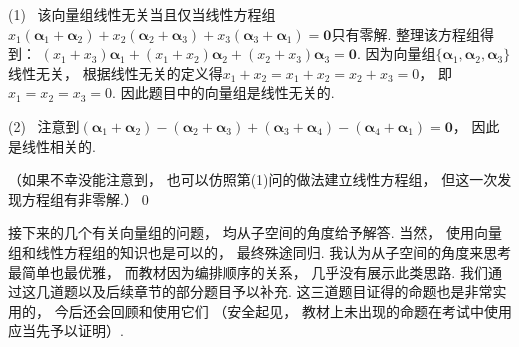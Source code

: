 \begin{solution}
    (1)~
    该向量组线性无关当且仅当线性方程组
    $x_1(\bm{\alpha}_1+\bm{\alpha}_2)+
     x_2(\bm{\alpha}_2+\bm{\alpha}_3)+
     x_3(\bm{\alpha}_3+\bm{\alpha}_1) = \bm{0}$只有零解.
     整理该方程组得到：
     $(x_1 + x_3)\bm{\alpha}_1
     + (x_1 + x_2)\bm{\alpha}_2
     + (x_2 + x_3)\bm{\alpha}_3 = \bm{0}$.
     因为向量组$\{ \bm{\alpha}_1 , \bm{\alpha}_2 , \bm{\alpha}_3 \}$线性无关，
     根据线性无关的定义得$x_1 + x_2 = x_1 + x_2 = x_2 + x_3 = 0$，
     即$x_1 = x_2 = x_3 = 0$.
     因此题目中的向量组是线性无关的.

     (2)~
     注意到$(\bm{\alpha}_1+\bm{\alpha}_2)
     -(\bm{\alpha}_2+\bm{\alpha}_3)
    +(\bm{\alpha}_3+\bm{\alpha}_4)
    -(\bm{\alpha}_4+\bm{\alpha}_1) = \bm{0}$，
    因此是线性相关的.
    
    （如果不幸没能注意到，
    也可以仿照第(1)问的做法建立线性方程组，
    但这一次发现方程组有非零解.）\qed
\end{solution}

\bigskip

接下来的几个有关向量组的问题，
均从子空间的角度给予解答.
当然，
使用向量组和线性方程组的知识也是可以的，
最终殊途同归.
我认为从子空间的角度来思考最简单也最优雅，
而教材因为编排顺序的关系，
几乎没有展示此类思路.
我们通过这几道题以及后续章节的部分题目予以补充.
这三道题目证得的命题也是非常实用的，
今后还会回顾和使用它们
（安全起见，
教材上未出现的命题在考试中使用应当先予以证明）.


\bigskip


